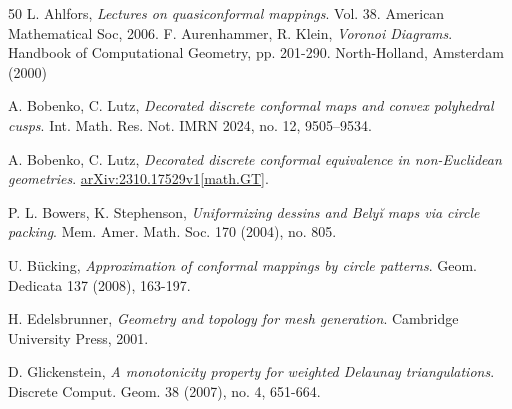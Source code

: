 \documentclass[12pt]{amsart}
\begin{document}












\begin{thebibliography}{50}
{} L. Ahlfors,  \emph{Lectures on quasiconformal mappings}. Vol. 38. American Mathematical Soc, 2006.
 F. Aurenhammer, R. Klein, \emph{Voronoi Diagrams}. Handbook of Computational Geometry, pp. 201-290. North-Holland, Amsterdam (2000)

 A. Bobenko, C. Lutz, \emph{Decorated discrete conformal maps and convex polyhedral cusps}. Int. Math. Res. Not. IMRN 2024, no. 12, 9505–9534.

 A. Bobenko, C. Lutz, \emph{Decorated discrete conformal equivalence in non-Euclidean geometries}. \href{https://arxiv.org/abs/2310.17529}{ arXiv:2310.17529v1[math.GT]}.

 P. L. Bowers, K. Stephenson, \emph{Uniformizing dessins and Bely\u{i} maps via circle packing}. Mem. Amer. Math. Soc. 170 (2004), no. 805.

 U. B\"{u}cking,  \emph{Approximation of conformal mappings by circle patterns}. Geom. Dedicata 137 (2008), 163-197.



 H. Edelsbrunner,  \emph{Geometry and topology for mesh generation}. Cambridge University Press, 2001.


 D. Glickenstein, \emph{A monotonicity property for weighted Delaunay triangulations}. Discrete Comput. Geom. 38 (2007), no. 4, 651-664.


\end{thebibliography}
\end{document}
